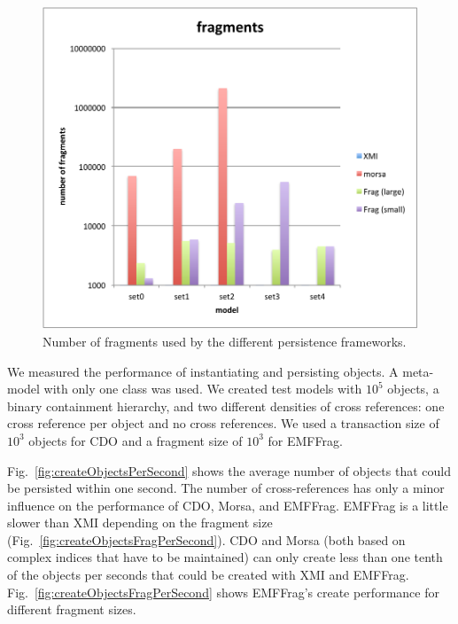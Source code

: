 \begin{figure}[t]
\hspace{0.02\linewidth}
\begin{minipage}[b]{0.48\linewidth}
\centering
\includegraphics[width=\linewidth]{figures/grabatsFragments}
\caption{Number of fragments used by the different persistence frameworks.}
\label{fig:grabatsFragments}
\end{minipage}
\end{figure}

 We measured the performance of instantiating and persisting objects. A meta-model with only one class was used. We created test models with $10^5$ objects, a binary containment hierarchy, and two different densities of cross references: one cross reference per object and no cross references. We used a transaction size of $10^3$ objects for CDO and a fragment size of $10^3$ for EMFFrag.

Fig.~\ref{fig:createObjectsPerSecond} shows the average number of objects that could be persisted within one second. The number of cross-references has only a minor influence on the performance of CDO, Morsa, and EMFFrag. EMFFrag is a little slower than XMI depending on the fragment size (Fig.~\ref{fig:createObjectsFragPerSecond}). CDO and Morsa (both based on complex indices that have to be maintained) can only create less than one tenth of the objects per seconds that could be created with XMI and EMFFrag. Fig.~\ref{fig:createObjectsFragPerSecond} shows EMFFrag's create performance for different fragment sizes.

